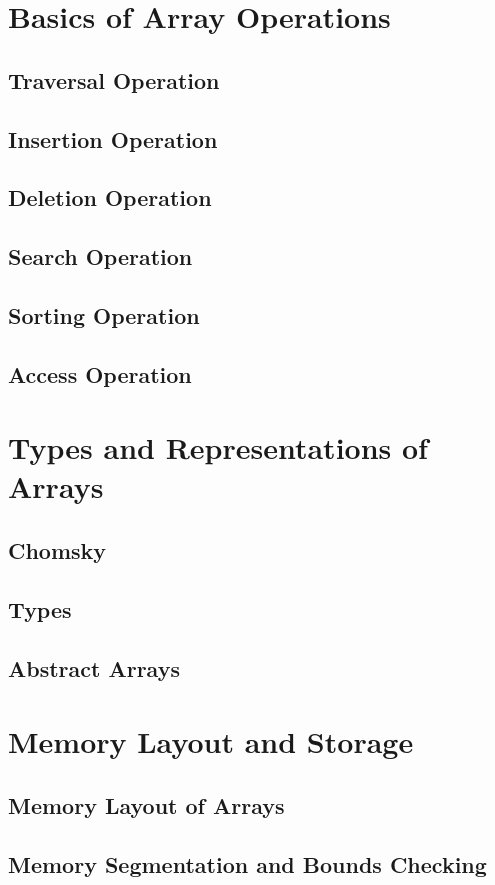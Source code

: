 \documentclass[12pt, oneside]{book}
\begin{document}
	\chapter{Basics of Array Operations}
	\section{Traversal Operation}
	\section{Insertion Operation}
	\section{Deletion Operation}
	\section{Search Operation}
	\section{Sorting Operation}
	\section{Access Operation}
	\chapter{Types and Representations of Arrays}
	\section{Chomsky}
	\section{Types}
	\section{Abstract Arrays}
	\chapter{Memory Layout and Storage}
	\section{Memory Layout of Arrays}
	\section{Memory Segmentation and Bounds Checking}
\end{document}
